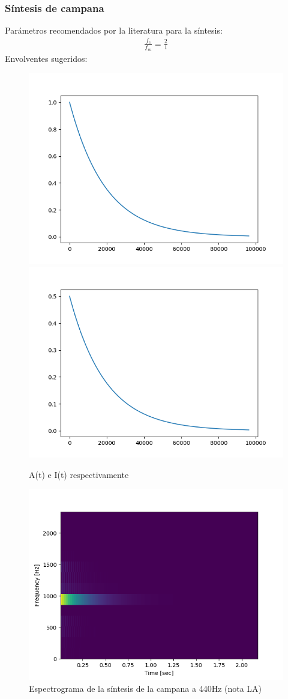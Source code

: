 \documentclass[assd_tp2_main.tex]{subfiles}
\begin{document}
\subsubsection{Síntesis de campana}
Parámetros recomendados por la literatura para la síntesis:
\begin{eqnarray*}
\displaystyle \frac{f_c}{f_m}=\frac{2}{1}
\end{eqnarray*}
Envolventes sugeridos:
\begin{figure}[H]
\centering
\includegraphics[width=0.4\linewidth]{graficos/EJ4/bell_at.png}
\includegraphics[width=0.4\linewidth]{graficos/EJ4/bell_it.png}
\caption{A(t) e I(t) respectivamente}
\label{fig:bell_envelopes}
\end{figure}

\begin{figure}[H]
\centering
\includegraphics[width=0.4\linewidth]{graficos/EJ4/BellEspectogram440Hz.png}
\caption{Espectrograma de la síntesis de la campana a 440Hz (nota LA)}
\label{fig:clarinet_440}
\end{figure}
\end{document}
